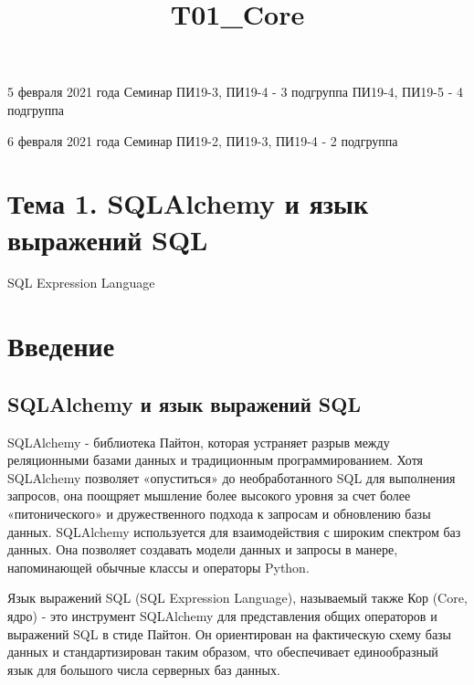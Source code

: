 \documentclass[11pt]{article}
\title{T01\_Core}
\begin{document}
    
    
    \maketitle
    
    

    
    

    5 февраля 2021 года Семинар ПИ19-3, ПИ19-4 - 3 подгруппа ПИ19-4, ПИ19-5
- 4 подгруппа

6 февраля 2021 года Семинар ПИ19-2, ПИ19-3, ПИ19-4 - 2 подгруппа

    \section{Тема 1. SQLAlchemy и язык выражений
SQL}\label{ux442ux435ux43cux430-1.-sqlalchemy-ux438-ux44fux437ux44bux43a-ux432ux44bux440ux430ux436ux435ux43dux438ux439-sql}

SQL Expression Language

    \section{Введение}\label{ux432ux432ux435ux434ux435ux43dux438ux435}

    \subsection{SQLAlchemy и язык выражений
SQL}\label{sqlalchemy-ux438-ux44fux437ux44bux43a-ux432ux44bux440ux430ux436ux435ux43dux438ux439-sql}

SQLAlchemy - библиотека Пайтон, которая устраняет разрыв между
реляционными базами данных и традиционным программированием. Хотя
SQLAlchemy позволяет «опуститься» до необработанного SQL для выполнения
запросов, она поощряет мышление более высокого уровня за счет более
«питонического» и дружественного подхода к запросам и обновлению базы
данных. SQLAlchemy используется для взаимодействия с широким спектром
баз данных. Она позволяет создавать модели данных и запросы в манере,
напоминающей обычные классы и операторы Python.

Язык выражений SQL (SQL Expression Language), называемый также Кор
(Core, ядро) - это инструмент SQLAlchemy для представления общих
операторов и выражений SQL в стиде Пайтон. Он ориентирован на
фактическую схему базы данных и стандартизирован таким образом, что
обеспечивает единообразный язык для большого числа серверных баз данных.
\end{document}
